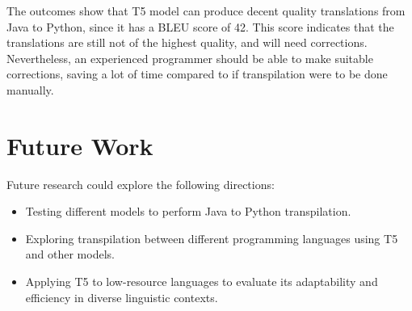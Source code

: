 \documentclass{dhbenelux}
\begin{document}
The outcomes show that T5 model can produce decent quality translations from Java to Python, since it has a BLEU score of 42. This score indicates that the translations are still not of the highest quality, and will need corrections. Nevertheless, an experienced programmer should be able to make suitable corrections, saving a lot of time compared to if transpilation were to be done manually.

\section{Future Work}
Future research could explore the following directions:
\begin{itemize}
    \item Testing different models to perform Java to Python transpilation.
    \item Exploring transpilation between different programming languages using T5 and other models.
    \item Applying T5 to low-resource languages to evaluate its adaptability and efficiency in diverse linguistic contexts.
\end{itemize}
\end{document}
